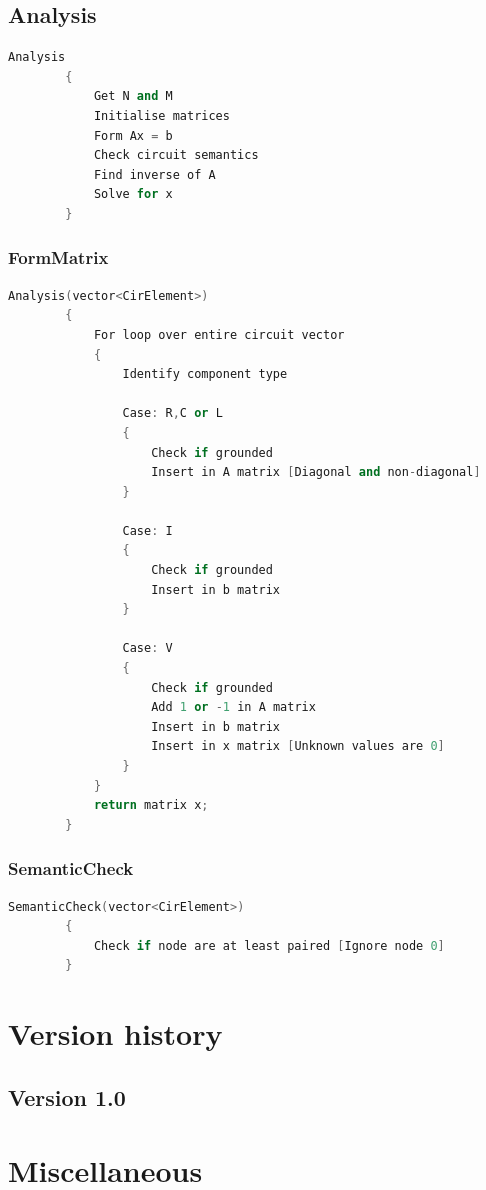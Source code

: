 \documentclass[a4paper, titlepage]{article}
\begin{document}
    \subsection{Analysis}
    \begin{lstlisting}[language=C++]
        Analysis
        {
            Get N and M
            Initialise matrices
            Form Ax = b
            Check circuit semantics
            Find inverse of A
            Solve for x
        }
    \end{lstlisting}

    \subsubsection{FormMatrix}
    \begin{lstlisting}[language=C++]
        Analysis(vector<CirElement>)
        {
            For loop over entire circuit vector
            {
                Identify component type

                Case: R,C or L
                {
                    Check if grounded
                    Insert in A matrix [Diagonal and non-diagonal]
                }
                
                Case: I
                {
                    Check if grounded
                    Insert in b matrix
                }

                Case: V
                {
                    Check if grounded
                    Add 1 or -1 in A matrix             
                    Insert in b matrix
                    Insert in x matrix [Unknown values are 0]            
                }
            }
            return matrix x;
        }
    \end{lstlisting}
    \subsubsection{SemanticCheck}
    \begin{lstlisting}[language=C++]
        SemanticCheck(vector<CirElement>)
        {
            Check if node are at least paired [Ignore node 0]
        }
    \end{lstlisting}
    
    \pagebreak

    \section{Version history}
    \subsection{Version 1.0}
    
    \pagebreak
    \section{Miscellaneous}



    \pagebreak
    \printbibliography[title={References}]
\end{document}
